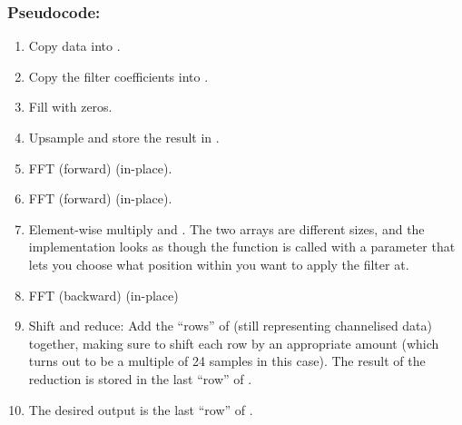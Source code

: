\documentclass{article}
\begin{document}
\subsubsection*{Pseudocode:}

\begin{enumerate}
    \item Copy  data into .
    \item Copy the filter coefficients into .
    \item Fill  with zeros.
    \item Upsample  and store the result in .
    \item FFT (forward)  (in-place).
    \item FFT (forward)  (in-place).
    \item Element-wise multiply  and .
        The two arrays are different sizes, and the implementation looks as though the function is called with a parameter that lets you choose what position within  you want to apply the filter at.
    \item FFT (backward)  (in-place)
    \item Shift and reduce: Add the ``rows'' of  (still representing channelised data) together, making sure to shift each row by an appropriate amount (which turns out to be a multiple of 24 samples in this case).
        The result of the reduction is stored in the last ``row'' of .
    \item The desired output is the last ``row'' of .
\end{enumerate}
\end{document}
